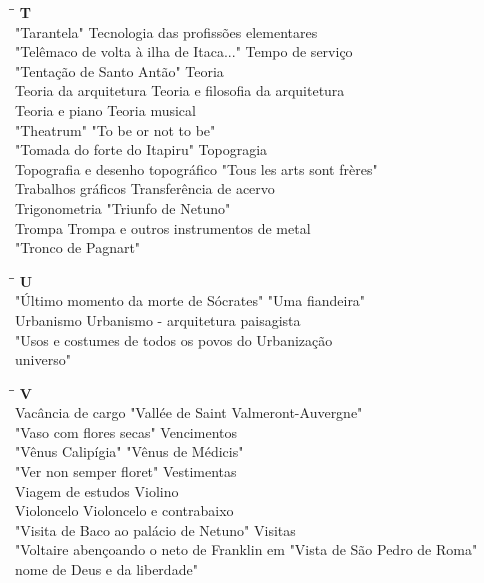 \begin{tabbing}
	\hspace{8,7cm}\=\hspace{1cm}\=\kill
	\textbf{T} \>  \\ 
	"Tarantela" \> Tecnologia das profissões elementares\\
	"Telêmaco de volta à ilha de Itaca..." \> Tempo de serviço\\
	"Tentação de Santo Antão"\> Teoria\\
	Teoria da arquitetura \> Teoria e filosofia da arquitetura\\ 
	Teoria e piano \>  Teoria musical\\ 
	"Theatrum" \> "To be or not to be"\\ 
	"Tomada do forte do Itapiru"  \> Topogragia\\
	Topografia e desenho topográfico \> "Tous les arts sont frères"\\
	Trabalhos gráficos \> Transferência de acervo\\
	Trigonometria \> "Triunfo de Netuno"\\
	Trompa \> Trompa e outros instrumentos de metal\\
	"Tronco de Pagnart" \> \\
\end{tabbing}

\begin{tabbing}
	\hspace{8,7cm}\=\hspace{1cm}\=\kill
	\textbf{U} \>  \\ 
	"Último momento da morte de Sócrates" \> "Uma fiandeira"\\
	Urbanismo \> Urbanismo - arquitetura paisagista\\
	"Usos e costumes de todos os povos do\> Urbanização\\
	universo" \> \\
\end{tabbing}

\begin{tabbing}
	\hspace{8,7cm}\=\hspace{1cm}\=\kill
	\textbf{V} \>  \\ 
    Vacância de cargo \> "Vallée de Saint Valmeront-Auvergne"\\
	"Vaso com flores secas" \> Vencimentos\\
	"Vênus Calipígia"\> "Vênus de Médicis"\\
	"Ver non semper floret" \> Vestimentas \\
	Viagem de estudos \> Violino\\
	Violoncelo \> Violoncelo e contrabaixo\\
	"Visita de Baco ao palácio de Netuno"\> Visitas\\
	"Voltaire abençoando o neto de Franklin em \> "Vista de São Pedro de Roma"\\
	nome de Deus e da liberdade" \> \\
\end{tabbing}

